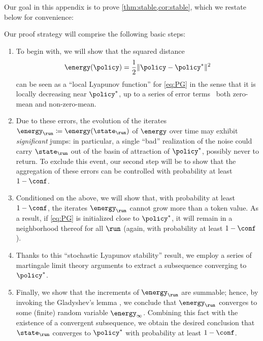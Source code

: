 

Our goal in this appendix is to prove \cref{thm:stable,cor:stable}, which we restate below for convenience:

\stable*

\corstable*

Our proof strategy will comprise the following basic steps:

\begin{enumerate}

\item
To begin with, we will show that the squared distance
\begin{equation}
\label{eq:energy}
\energy(\policy)
	= \frac{1}{2}\norm{\policy - \eq}^{2}
\end{equation}
can be seen as a ``local Lyapunov function'' for \eqref{eq:PG} in the sense that it is locally decreasing near $\eq$, up to a series of error terms \textendash\ both zero-mean and non-zero-mean.

\item
Due to these errors, the evolution of the iterates $\curr[\energy] \defeq \energy(\curr)$ of $\energy$ over time may exhibit \emph{significant} jumps:
in particular, a single ``bad'' realization of the noise could carry $\curr$ out of the basin of attraction of $\eq$, possibly never to return.
To exclude this event, our second step will be to show that the aggregation of these errors can be controlled with probability at least $1-\conf$.

\item
Conditioned on the above, we will show that, with probability at least $1-\conf$, the iterates $\curr[\energy]$ cannot grow more than a token value.
As a result, if \eqref{eq:PG} is initialized close to $\eq$, it will remain in a neighborhood thereof for all $\run$ (again, with probability at least $1-\conf$).

\item
Thanks to this ``stochastic Lyapunov stability'' result, we employ a series of martingale limit theory arguments to extract a subsequence converging to $\eq$.

\item
Finally, we show that the increments of $\curr[\energy]$ are summable;
hence, by invoking the Gladyshev's lemma \cite[p.~49]{Pol87}, we conclude that $\curr[\energy]$ converges to some (finite) random variable $\energy_{\infty}$.
Combining this fact with the existence of a convergent subsequence, we obtain the desired conclusion that $\curr$ converges to $\eq$ with probability at least $1-\conf$.
\end{enumerate}

